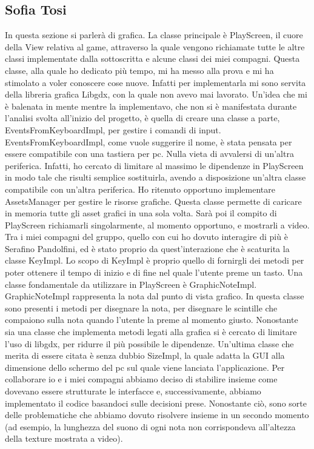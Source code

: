 \documentclass[a4paper,12pt]{report}
\begin{document}
\subsection{Sofia Tosi}
In questa sezione si parlerà di grafica. La classe principale è PlayScreen, il cuore della View relativa al game, attraverso la
quale vengono richiamate tutte le altre classi implementate dalla sottoscritta e alcune classi dei miei compagni. 
Questa classe, alla quale ho dedicato più tempo, mi ha messo alla prova e mi ha stimolato a voler conoscere cose nuove. Infatti per implementarla
mi sono servita della libreria grafica Libgdx, con la quale non avevo mai lavorato. Un'idea che mi è balenata in mente mentre la implementavo, che non si è 
manifestata durante l'analisi svolta all'inizio del progetto, è quella di creare una classe a parte, EventsFromKeyboardImpl, 
per gestire i comandi di input. EventsFromKeyboardImpl, come vuole suggerire il nome, è stata pensata per essere compatibile con una tastiera per pc. 
Nulla vieta di avvalersi di un'altra periferica. Infatti, ho cercato di limitare al massimo le dipendenze in PlayScreen in modo tale che risulti semplice sostituirla, 
avendo a disposizione un'altra classe compatibile con un'altra periferica.
Ho ritenuto opportuno implementare AssetsManager per gestire le risorse grafiche. Questa classe permette di caricare in memoria tutte gli asset grafici in una
sola volta. Sarà poi il compito di PlayScreen richiamarli singolarmente, al momento opportuno, e mostrarli a video.
Tra i miei compagni del gruppo, quello con cui ho dovuto interagire di più è Serafino Pandolfini, ed è stato proprio da quest'interazione che è scaturita la classe
KeyImpl. Lo scopo di KeyImpl è proprio quello di fornirgli dei metodi per poter ottenere il tempo di inizio e di fine nel quale l'utente preme un tasto.
Una classe fondamentale da utilizzare in PlayScreen è GraphicNoteImpl. GraphicNoteImpl rappresenta la nota dal punto di vista grafico. In questa classe sono presenti i metodi per disegnare la nota, per disegnare le scintille che compaiono sulla nota quando l'utente la
preme al momento giusto. Nonostante sia una classe che implementa metodi legati alla grafica si è cercato di limitare l'uso di libgdx, per ridurre il più
possibile le dipendenze. Un'ultima classe che merita di essere citata è senza dubbio SizeImpl, la quale adatta la GUI alla dimensione dello schermo del pc sul quale viene 
lanciata l'applicazione.
Per collaborare io e i miei compagni abbiamo deciso di stabilire insieme come dovevano essere strutturate le interfacce e, successivamente, abbiamo implementato il codice basandoci sulle decisioni prese. Nonostante ciò, sono sorte delle problematiche che abbiamo dovuto risolvere insieme in un secondo momento (ad esempio, la lunghezza del suono di ogni nota non corrispondeva all'altezza della texture mostrata a video).  
\end{document}
